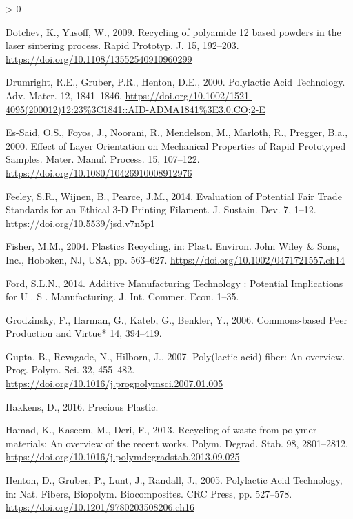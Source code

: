 \documentclass[
]{article}
\newlength{\cslhangindent}
\newenvironment{CSLReferences}[2] %
 {%
  \setlength{\parindent}{0pt}
  \ifodd #1 \everypar{\setlength{\hangindent}{\cslhangindent}}\ignorespaces\fi
  \ifnum #2 > 0
  \setlength{\parskip}{#2\baselineskip}
  \fi
 }%
 {}
\begin{document}
\begin{CSLReferences}{1}{0}
\leavevmode\hypertarget{ref-Dotchev2009}{}%
Dotchev, K., Yusoff, W., 2009. {Recycling of polyamide 12 based powders
in the laser sintering process}. Rapid Prototyp. J. 15, 192--203.
\url{https://doi.org/10.1108/13552540910960299}

\leavevmode\hypertarget{ref-Drumright2000}{}%
Drumright, R.E., Gruber, P.R., Henton, D.E., 2000. {Polylactic Acid
Technology}. Adv. Mater. 12, 1841--1846.
\url{https://doi.org/10.1002/1521-4095(200012)12:23\%3C1841::AID-ADMA1841\%3E3.0.CO;2-E}

\leavevmode\hypertarget{ref-Es-Said2000}{}%
Es-Said, O.S., Foyos, J., Noorani, R., Mendelson, M., Marloth, R.,
Pregger, B.a., 2000. {Effect of Layer Orientation on Mechanical
Properties of Rapid Prototyped Samples}. Mater. Manuf. Process. 15,
107--122. \url{https://doi.org/10.1080/10426910008912976}

\leavevmode\hypertarget{ref-Feeley2014}{}%
Feeley, S.R., Wijnen, B., Pearce, J.M., 2014. {Evaluation of Potential
Fair Trade Standards for an Ethical 3-D Printing Filament}. J. Sustain.
Dev. 7, 1--12. \url{https://doi.org/10.5539/jsd.v7n5p1}

\leavevmode\hypertarget{ref-Fisher2004}{}%
Fisher, M.M., 2004. {Plastics Recycling}, in: Plast. Environ. John Wiley
{\&} Sons, Inc., Hoboken, NJ, USA, pp. 563--627.
\url{https://doi.org/10.1002/0471721557.ch14}

\leavevmode\hypertarget{ref-Ford2014}{}%
Ford, S.L.N., 2014. {Additive Manufacturing Technology : Potential
Implications for U . S . Manufacturing}. J. Int. Commer. Econ. 1--35.

\leavevmode\hypertarget{ref-Grodzinsky2006}{}%
Grodzinsky, F., Harman, G., Kateb, G., Benkler, Y., 2006. {Commons-based
Peer Production and Virtue*} 14, 394--419.

\leavevmode\hypertarget{ref-Gupta2007}{}%
Gupta, B., Revagade, N., Hilborn, J., 2007. {Poly(lactic acid) fiber: An
overview}. Prog. Polym. Sci. 32, 455--482.
\url{https://doi.org/10.1016/j.progpolymsci.2007.01.005}

\leavevmode\hypertarget{ref-Hakkens2016}{}%
Hakkens, D., 2016. {Precious Plastic}.

\leavevmode\hypertarget{ref-Hamad2013}{}%
Hamad, K., Kaseem, M., Deri, F., 2013. {Recycling of waste from polymer
materials: An overview of the recent works}. Polym. Degrad. Stab. 98,
2801--2812. \url{https://doi.org/10.1016/j.polymdegradstab.2013.09.025}

\leavevmode\hypertarget{ref-Henton2005}{}%
Henton, D., Gruber, P., Lunt, J., Randall, J., 2005. {Polylactic Acid
Technology}, in: Nat. Fibers, Biopolym. Biocomposites. CRC Press, pp.
527--578. \url{https://doi.org/10.1201/9780203508206.ch16}


\end{CSLReferences}
\end{document}
